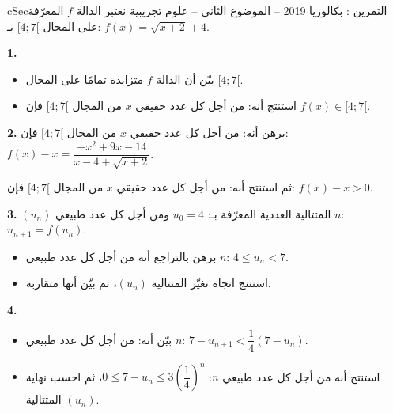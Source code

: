 \documentclass[12pt,a4paper]{article}
\newenvironment{BOX}[2]{\begin{otherlanguage}{english}\begin{arbox}{#1}{#2}}{\end{arbox}\end{otherlanguage}}
\newcounter{exo}
\newenvironment{tamrin}[1]{\stepcounter{exo}\begin{BOX}{cSec}{التمرين \theexo: #1}}{\end{BOX}}
\newenvironment{sq}{\begin{itemize}[leftmargin=2.4em,itemsep=3pt]}{\end{itemize}}
\newcommand{\qa}{\item[(أ)]}\newcommand{\qb}{\item[(ب)]}\newcommand{\qc}{\item[(جـ)]}\newcommand{\qd}{\item[(د)]}\newcommand{\qe}{\item[(هـ)]}
\newcommand{\QQ}[1]{\par\smallskip\textbf{#1.} }
\begin{document}
\begin{tamrin}{بكالوريا 2019 -- الموضوع الثاني -- علوم تجريبية}
نعتبر الدالة $f$ المعرّفة على المجال $[4;7[$ بـ: $f(x)=\sqrt{x+2}+4$.
\QQ{1}
\begin{sq}
\qa بيّن أن الدالة $f$ متزايدة تمامًا على المجال $[4;7[$.
\qb استنتج أنه: من أجل كل عدد حقيقي $x$ من المجال $[4;7[$ فإن $f(x)\in[4;7[$.
\end{sq}
\QQ{2} برهن أنه: من أجل كل عدد حقيقي $x$ من المجال $[4;7[$ فإن: $f(x)-x=\dfrac{-x^2+9x-14}{x-4+\sqrt{x+2}}$.

ثم استنتج أنه: من أجل كل عدد حقيقي $x$ من المجال $[4;7[$ فإن: $f(x)-x>0$.
\QQ{3} $(u_n)$ المتتالية العددية المعرّفة بـ: $u_0=4$ ومن أجل كل عدد طبيعي $n$: $u_{n+1}=f\left(u_n\right)$.
\begin{sq}
\qa برهن بالتراجع أنه من أجل كل عدد طبيعي $n$: $4\leq u_n<7$.
\qb استنتج اتجاه تغيّر المتتالية $(u_n)$، ثم بيّن أنها متقاربة.
\end{sq}
\QQ{4}
\begin{sq}
\qa بيّن أنه: من أجل كل عدد طبيعي $n$: $7-u_{n+1}<\dfrac{1}{4}\left(7-u_n\right)$.
\qb استنتج أنه من أجل كل عدد طبيعي $n$: $0\leq 7-u_n\leq 3\left(\dfrac{1}{4}\right)^n$، ثم احسب نهاية المتتالية $(u_n)$.
\end{sq}
\end{tamrin}
\end{document}
